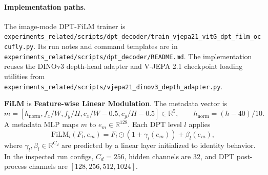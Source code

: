 \documentclass[10pt]{article}
\newcommand{\R}{\mathbb{R}}
\newcommand{\codepath}[1]{\begingroup\small\nolinkurl{#1}\endgroup}
\begin{document}
\paragraph{Implementation paths.}
The image-mode DPT-FiLM trainer is \codepath{experiments_related/scripts/dpt_decoder/train_vjepa21_vitG_dpt_film_occufly.py}.  Its run notes and command templates are in \codepath{experiments_related/scripts/dpt_decoder/README.md}.  The implementation reuses the DINOv3 depth-head adapter and V-JEPA 2.1 checkpoint loading utilities from \codepath{experiments_related/scripts/vjepa21_dinov3_depth_adapter.py}.

\textbf{FiLM} is \textbf{Feature-wise Linear Modulation}.  The metadata vector is
\[
m=[h_{\mathrm{norm}}, f_x/W, f_y/H, c_x/W-0.5, c_y/H-0.5]\in\R^5,\qquad
h_{\mathrm{norm}}=(h-40)/10 .
\]
A metadata MLP maps \(m\) to \(e_m\in\R^{128}\).  Each DPT level \(l\) applies
\[
\mathrm{FiLM}_l(F_l,e_m)=F_l\odot\left(1+\gamma_l(e_m)\right)+\beta_l(e_m),
\]
where \(\gamma_l,\beta_l\in\R^{C_d}\) are predicted by a linear layer initialized to identity behavior.  In the inspected run configs, \(C_d=256\), hidden channels are 32, and DPT post-process channels are \([128,256,512,1024]\).

\begin{center}
\end{center}
\end{document}
